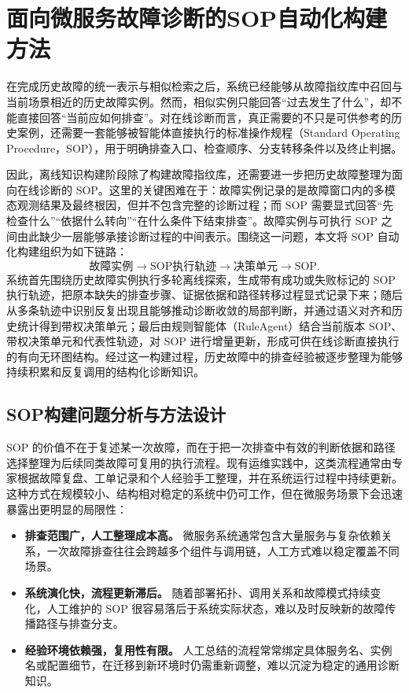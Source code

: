 
\section{面向微服务故障诊断的SOP自动化构建方法}

在完成历史故障的统一表示与相似检索之后，系统已经能够从故障指纹库中召回与当前场景相近的历史故障实例。然而，相似实例只能回答“过去发生了什么”，却不能直接回答“当前应如何排查”。对在线诊断而言，真正需要的不只是可供参考的历史案例，还需要一套能够被智能体直接执行的标准操作规程（Standard Operating Procedure，SOP），用于明确排查入口、检查顺序、分支转移条件以及终止判据。

因此，离线知识构建阶段除了构建故障指纹库，还需要进一步把历史故障整理为面向在线诊断的 SOP。这里的关键困难在于：故障实例记录的是故障窗口内的多模态观测结果及最终根因，但并不包含完整的诊断过程；而 SOP 需要显式回答“先检查什么”“依据什么转向”“在什么条件下结束排查”。故障实例与可执行 SOP 之间由此缺少一层能够承接诊断过程的中间表示。围绕这一问题，本文将 SOP 自动化构建组织为如下链路：
\[
\text{故障实例} \rightarrow \text{SOP执行轨迹} \rightarrow \text{决策单元} \rightarrow \text{SOP}.
\]
系统首先围绕历史故障实例执行多轮离线探索，生成带有成功或失败标记的 SOP执行轨迹，把原本缺失的排查步骤、证据依据和路径转移过程显式记录下来；随后从多条轨迹中识别反复出现且能够推动诊断收敛的局部判断，并通过语义对齐和历史统计得到带权决策单元；最后由规则智能体（RuleAgent）结合当前版本 SOP、带权决策单元和代表性轨迹，对 SOP 进行增量更新，形成可供在线诊断直接执行的有向无环图结构。经过这一构建过程，历史故障中的排查经验被逐步整理为能够持续积累和反复调用的结构化诊断知识。

\subsection{SOP构建问题分析与方法设计}

SOP 的价值不在于复述某一次故障，而在于把一次排查中有效的判断依据和路径选择整理为后续同类故障可复用的执行流程。现有运维实践中，这类流程通常由专家根据故障复盘、工单记录和个人经验手工整理，并在系统运行过程中持续更新。这种方式在规模较小、结构相对稳定的系统中仍可工作，但在微服务场景下会迅速暴露出更明显的局限性：

\begin{itemize}
    \item \textbf{排查范围广，人工整理成本高。} 微服务系统通常包含大量服务与复杂依赖关系，一次故障排查往往会跨越多个组件与调用链，人工方式难以稳定覆盖不同场景。
    \item \textbf{系统演化快，流程更新滞后。} 随着部署拓扑、调用关系和故障模式持续变化，人工维护的 SOP 很容易落后于系统实际状态，难以及时反映新的故障传播路径与排查分支。
    \item \textbf{经验环境依赖强，复用性有限。} 人工总结的流程常常绑定具体服务名、实例名或配置细节，在迁移到新环境时仍需重新调整，难以沉淀为稳定的通用诊断知识。
\end{itemize}

